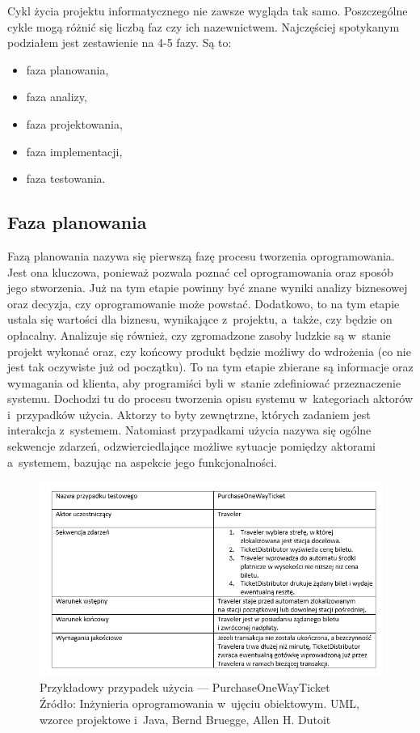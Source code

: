 \documentclass[oneside,polski,logo]{amuthesis}
\begin{document}
Cykl życia projektu informatycznego nie zawsze wygląda tak samo. Poszczególne cykle mogą różnić się liczbą faz czy ich nazewnictwem. Najczęściej spotykanym podziałem jest zestawienie na 4-5 fazy. \cite{zarzadzanie5} Są to:

\begin{itemize}
	\item faza planowania,
	\item faza analizy,
	\item faza projektowania,
	\item faza implementacji,
	\item faza testowania. 
\end{itemize}

\subsection {Faza planowania}
Fazą planowania nazywa się pierwszą fazę procesu tworzenia oprogramowania. Jest ona kluczowa, ponieważ pozwala poznać cel oprogramowania oraz sposób jego stworzenia. Już na tym etapie powinny być znane wyniki analizy biznesowej oraz decyzja, czy oprogramowanie może powstać. Dodatkowo, to na tym etapie ustala się wartości dla biznesu, wynikające z~projektu, a~także, czy będzie on opłacalny. Analizuje się również, czy zgromadzone zasoby ludzkie są w~stanie projekt wykonać oraz, czy końcowy produkt będzie możliwy do wdrożenia (co nie jest tak oczywiste już od początku). To na tym etapie zbierane są informacje oraz wymagania od klienta, aby programiści byli w~stanie zdefiniować przeznaczenie systemu. Dochodzi tu do procesu tworzenia opisu systemu w~kategoriach aktorów i~przypadków użycia. Aktorzy to byty zewnętrzne, których zadaniem jest interakcja z~systemem. Natomiast przypadkami użycia nazywa się ogólne sekwencje zdarzeń, odzwierciedlające możliwe sytuacje pomiędzy aktorami a~systemem, bazując na aspekcie jego funkcjonalności.

\begin{figure}[h]
	\centering
	\includegraphics[width=13cm]{images/hyps/use-case.png}
	\caption{Przykładowy przypadek użycia — PurchaseOneWayTicket \\ Źródło:  Inżynieria oprogramowania w~ujęciu obiektowym. UML, wzorce projektowe i~Java, Bernd Bruegge, Allen H. Dutoit}
\end{figure}
\end{document}

